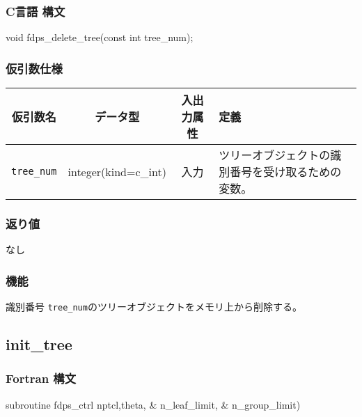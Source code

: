 \subsubsection*{C言語 構文}
\begin{screen}
\begin{spverbatim}
void fdps_delete_tree(const int tree_num);
\end{spverbatim}
\end{screen}

\subsubsection*{仮引数仕様}
\begin{table}[h]
\begin{tabularx}{\linewidth}{cccX}
\toprule
\rowcolor{Snow2}
仮引数名 & データ型 & 入出力属性 & 定義 \\
\midrule
\verb|tree_num| & integer(kind=c\_int) & 入力 & ツリーオブジェクトの識別番号を受け取るための変数。\\
\bottomrule
\end{tabularx}
\end{table}

\subsubsection*{返り値}
なし

\subsubsection*{機能}
識別番号 \texttt{tree\_num}のツリーオブジェクトをメモリ上から削除する。
\clearpage

\subsection{init\_tree}
\subsubsection*{Fortran 構文}
\begin{screen}
\begin{spverbatim}
subroutine fdps_ctrl%
                               nptcl,theta,  &
                               n_leaf_limit, &
                               n_group_limit)
\end{spverbatim}
\end{screen}

